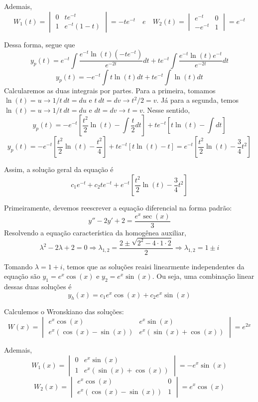 \documentclass[oneside,12pt,a4paper]{report}
\begin{document}
\begin{resolucao}
    Ademais,
    \[W_1(t)=\begin{vmatrix}
        0 & te^{-t}\\
        1 & e^{-t}(1-t)
    \end{vmatrix}=-te^{-t}\quad e \quad W_2(t)=\begin{vmatrix}
        e^{-t}   & 0\\
        -e^{-t} & 1
    \end{vmatrix}=e^{-t}\]

    Dessa forma, segue que
    \[y_p(t)=e^{-t}\int\frac{e^{-t}\ln(t)(-te^{-t})}{e^{-2t}}dt+te^{-t}\int\frac{e^{-t}\ln(t)e^{-t}}{e^{-2t}}dt\]
    \[y_p(t)=-e^{-t}\int t\ln(t)dt+te^{-t}\int\ln(t)dt\]
    Calcularemos as duas integrais por partes. Para a primeira, tomamos $\ln(t)=u\rightarrow1/t~dt=du$ e $t~dt=dv\rightarrow t^2/2=v$. Já para a segunda, temos $\ln(t)=u\rightarrow1/t~dt=du$ e $dt=dv\rightarrow t=v$. Nesse sentido,
    \[y_p(t)=-e^{-t}\left[\frac{t^2}{2}\ln(t)-\int\frac{t}{2}dt\right]+te^{-t}\left[t\ln(t)-\int dt\right]\]
    \[y_p(t)=-e^{-t}\left[\frac{t^2}{2}\ln(t)-\frac{t^2}{4}\right]+te^{-t}\left[t\ln(t)-t\right]=e^{-t}\left[\frac{t^2}{2}\ln(t)-\frac{3}{4}t^2\right]\]

    Assim, a solução geral da equação é
    \[\boxed{c_1e^{-t}+c_2te^{-t}+e^{-t}\left[\frac{t^2}{2}\ln(t)-\frac{3}{4}t^2\right]}\]

    \itemresolucao Primeiramente, devemos reescrever a equação diferencial na forma padrão:
    \[y''-2y'+2=\frac{e^x\sec(x)}{3}\]
    Resolvendo a equação característica da homogênea auxiliar,
    \[\lambda^2-2\lambda+2=0\Rightarrow\lambda_{1,2}=\frac{2\pm\sqrt{2^2-4\cdot1\cdot2}}{2}\Rightarrow\lambda_{1,2}=1\pm i\]

    Tomando $\lambda=1+i$, temos que as soluções reaisi linearmente independentes da equação são $y_1=e^x\cos(x)$ e $y_2=e^x\sin(x)$. Ou seja, uma combinação linear dessas duas soluções é
    \[y_h(x)=c_1e^x\cos(x)+c_2e^x\sin(x)\]

    Calculemos o Wronskiano das soluções:
    \[W(x)=\begin{vmatrix}
        e^{x}\cos(x) & e^{x}\sin(x)\\
        e^{x}(\cos(x)-\sin(x)) & e^{x}(\sin(x)+\cos(x))
    \end{vmatrix}=e^{2x}\]

    Ademais,
    \[W_1(x)=\begin{vmatrix}
        0 & e^{x}\sin(x)\\
        1 & e^{x}(\sin(x)+\cos(x))
    \end{vmatrix}=-e^{x}\sin(x)\] 
    \[W_2(x)=\begin{vmatrix}
        e^{x}\cos(x) & 0\\
        e^{x}(\cos(x)-\sin(x)) & 1
    \end{vmatrix}=e^{x}\cos(x)\]


\end{resolucao}
\end{document}
